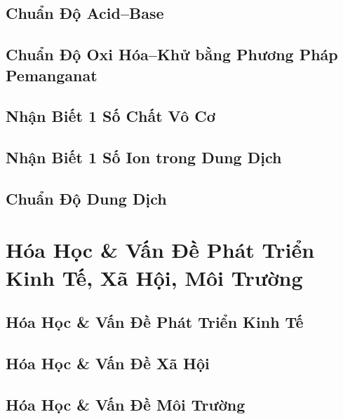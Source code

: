 \documentclass{article}
\numberwithin{equation}{section}
\begin{document}
\subsection{Chuẩn Độ Acid--Base}


\subsection{Chuẩn Độ Oxi Hóa--Khử bằng Phương Pháp Pemanganat}


\subsection{Nhận Biết 1 Số Chất Vô Cơ}


\subsection{Nhận Biết 1 Số Ion trong Dung Dịch}


\subsection{Chuẩn Độ Dung Dịch}


\section{Hóa Học \& Vấn Đề Phát Triển Kinh Tế, Xã Hội, Môi Trường}

\subsection{Hóa Học \& Vấn Đề Phát Triển Kinh Tế}


\subsection{Hóa Học \& Vấn Đề Xã Hội}


\subsection{Hóa Học \& Vấn Đề Môi Trường}


\newpage
\printbibliography[heading=bibintoc]
	
\end{document}
